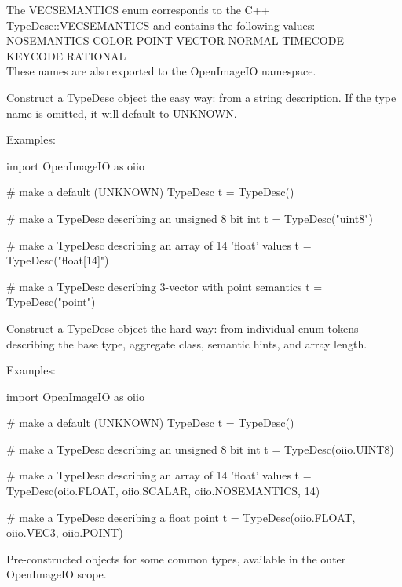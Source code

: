 The {\cf VECSEMANTICS} enum corresponds to the C++ {\cf TypeDesc::VECSEMANTICS} and
contains the following values: \\
{\cf NOSEMANTICS COLOR POINT VECTOR NORMAL TIMECODE KEYCODE RATIONAL} \\
These names are also exported to the {\cf OpenImageIO} namespace.
\apiend


Construct a {\cf TypeDesc} object the easy way: from a string description.
If the type name is omitted, it will default to {\cf UNKNOWN}.

\noindent Examples:
\begin{code}
    import OpenImageIO as oiio

    # make a default (UNKNOWN) TypeDesc
    t = TypeDesc()

    # make a TypeDesc describing an unsigned 8 bit int
    t = TypeDesc("uint8")

    # make a TypeDesc describing an array of 14 'float' values
    t = TypeDesc("float[14]")

    # make a TypeDesc describing 3-vector with point semantics
    t = TypeDesc("point")
\end{code}
\apiend


Construct a {\cf TypeDesc} object the hard way: from individual enum tokens
describing the base type, aggregate class, semantic hints, and array length.

\noindent Examples:
\begin{code}
    import OpenImageIO as oiio

    # make a default (UNKNOWN) TypeDesc
    t = TypeDesc()

    # make a TypeDesc describing an unsigned 8 bit int
    t = TypeDesc(oiio.UINT8)

    # make a TypeDesc describing an array of 14 'float' values
    t = TypeDesc(oiio.FLOAT, oiio.SCALAR, oiio.NOSEMANTICS, 14)

    # make a TypeDesc describing a float point
    t = TypeDesc(oiio.FLOAT, oiio.VEC3, oiio.POINT)
\end{code}
\apiend

Pre-constructed \TypeDesc objects for some common types, available in the
outer OpenImageIO scope.

